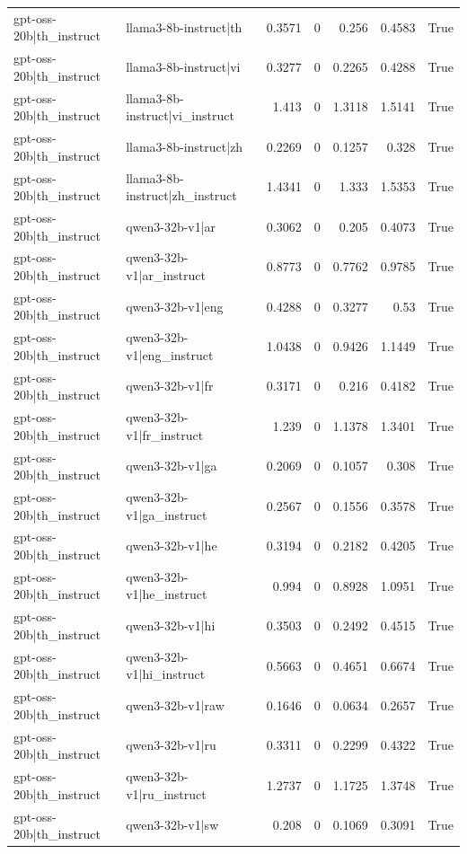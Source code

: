 \begin{table}
\begin{tabular}{l l r r r r l}
gpt-oss-20b|th_instruct & llama3-8b-instruct|th & 0.3571 & 0 & 0.256 & 0.4583 & True \\
gpt-oss-20b|th_instruct & llama3-8b-instruct|vi & 0.3277 & 0 & 0.2265 & 0.4288 & True \\
gpt-oss-20b|th_instruct & llama3-8b-instruct|vi_instruct & 1.413 & 0 & 1.3118 & 1.5141 & True \\
gpt-oss-20b|th_instruct & llama3-8b-instruct|zh & 0.2269 & 0 & 0.1257 & 0.328 & True \\
gpt-oss-20b|th_instruct & llama3-8b-instruct|zh_instruct & 1.4341 & 0 & 1.333 & 1.5353 & True \\
gpt-oss-20b|th_instruct & qwen3-32b-v1|ar & 0.3062 & 0 & 0.205 & 0.4073 & True \\
gpt-oss-20b|th_instruct & qwen3-32b-v1|ar_instruct & 0.8773 & 0 & 0.7762 & 0.9785 & True \\
gpt-oss-20b|th_instruct & qwen3-32b-v1|eng & 0.4288 & 0 & 0.3277 & 0.53 & True \\
gpt-oss-20b|th_instruct & qwen3-32b-v1|eng_instruct & 1.0438 & 0 & 0.9426 & 1.1449 & True \\
gpt-oss-20b|th_instruct & qwen3-32b-v1|fr & 0.3171 & 0 & 0.216 & 0.4182 & True \\
gpt-oss-20b|th_instruct & qwen3-32b-v1|fr_instruct & 1.239 & 0 & 1.1378 & 1.3401 & True \\
gpt-oss-20b|th_instruct & qwen3-32b-v1|ga & 0.2069 & 0 & 0.1057 & 0.308 & True \\
gpt-oss-20b|th_instruct & qwen3-32b-v1|ga_instruct & 0.2567 & 0 & 0.1556 & 0.3578 & True \\
gpt-oss-20b|th_instruct & qwen3-32b-v1|he & 0.3194 & 0 & 0.2182 & 0.4205 & True \\
gpt-oss-20b|th_instruct & qwen3-32b-v1|he_instruct & 0.994 & 0 & 0.8928 & 1.0951 & True \\
gpt-oss-20b|th_instruct & qwen3-32b-v1|hi & 0.3503 & 0 & 0.2492 & 0.4515 & True \\
gpt-oss-20b|th_instruct & qwen3-32b-v1|hi_instruct & 0.5663 & 0 & 0.4651 & 0.6674 & True \\
gpt-oss-20b|th_instruct & qwen3-32b-v1|raw & 0.1646 & 0 & 0.0634 & 0.2657 & True \\
gpt-oss-20b|th_instruct & qwen3-32b-v1|ru & 0.3311 & 0 & 0.2299 & 0.4322 & True \\
gpt-oss-20b|th_instruct & qwen3-32b-v1|ru_instruct & 1.2737 & 0 & 1.1725 & 1.3748 & True \\
gpt-oss-20b|th_instruct & qwen3-32b-v1|sw & 0.208 & 0 & 0.1069 & 0.3091 & True \\

\end{tabular}
\end{table}
